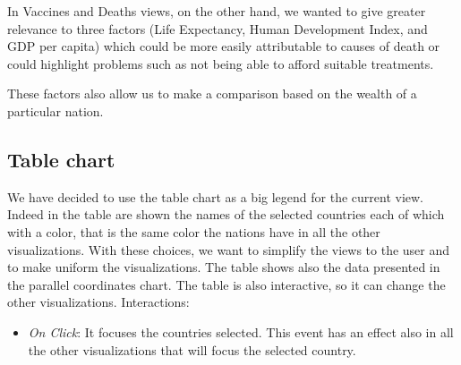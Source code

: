 \documentclass[10pt,conference]{IEEEtran}
\begin{document}
In Vaccines and Deaths views, on the other hand, we wanted to give greater relevance to three factors (Life Expectancy, Human Development Index, and GDP per capita) which could be more easily attributable to causes of death or could highlight problems such as not being able to afford suitable treatments.

These factors also allow us to make a comparison based on the wealth of a particular nation.

\begin{figure}
\end{figure}


\subsection{Table chart}
We have decided to use the table chart as a big legend for the current view. Indeed in the table are shown the names of the selected countries each of which with a color, that is the same color the nations have in all the other visualizations. With these choices, we want to simplify the views to the user and to make uniform the visualizations.
The table shows also the data presented in the parallel coordinates chart. The table is also interactive, so it can change the other visualizations.
Interactions:
\begin{itemize}
 \item {\em On Click}: It focuses the countries selected. This event has an effect also in all the other visualizations that will focus the selected country.
\end{itemize}

\begin{figure}
\end{figure}
\end{document}
